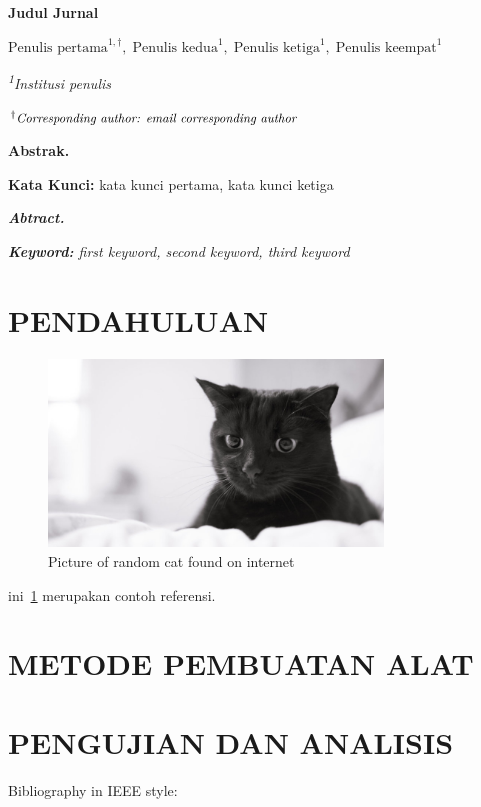 \documentclass[11pt, a4paper]{article}
\begin{document}
\begin{center}
    {\textbf{\Large Judul Jurnal}}\par
    \vspace{12pt}
    $\text{Penulis pertama}^{1, \dagger},\;\text{Penulis kedua}^1,\;\text{Penulis ketiga}^1,\;\text{Penulis keempat}^1$\par
    \vspace{11pt}
    {\textit{\small \textsuperscript{1}Institusi penulis}}\par
    $^\dagger \text{{\textit{\small Corresponding author: email corresponding author}}}$
\end{center}
\vspace{11pt}
\noindent \textbf{Abstrak.} \lipsum[1]\par
\vspace{11pt}
\noindent \textbf{Kata Kunci:} kata kunci pertama, kata kunci ketiga\par
\vspace{11pt}
\noindent \textit{\textbf{Abtract.} \lipsum[1]}\par
\vspace{11pt}
\noindent \textit{\textbf{Keyword:} first keyword, second keyword, third keyword}\par

\section{PENDAHULUAN}
\begin{figure}[H]
    \centering
    \includegraphics[height=5cm]{random-cat}
    \caption{Picture of random cat found on internet}\label{gambar:random-cat}
\end{figure}
ini~\cref{gambar:random-cat} merupakan contoh referensi.
\lipsum[1]
\section{METODE PEMBUATAN ALAT}
\lipsum[1]
\section{PENGUJIAN DAN ANALISIS}
Bibliography in IEEE style:
\end{document}
